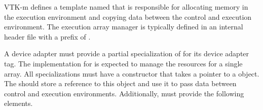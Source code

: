 
VTK-m defines a template named 
that is responsible for allocating memory in the execution environment and
copying data between the control and execution environment. The execution
array manager is typically defined in an internal header file with a prefix
of .


A device adapter must provide a partial specialization of
 for its device adapter tag. The
implementation for  is expected to
manage the resources for a single array. All
 specializations must have a
constructor that takes a pointer to a  object.
The  should store a reference to this
 object and use it to pass data between control and
execution environments. Additionally,
 must provide the following elements.

